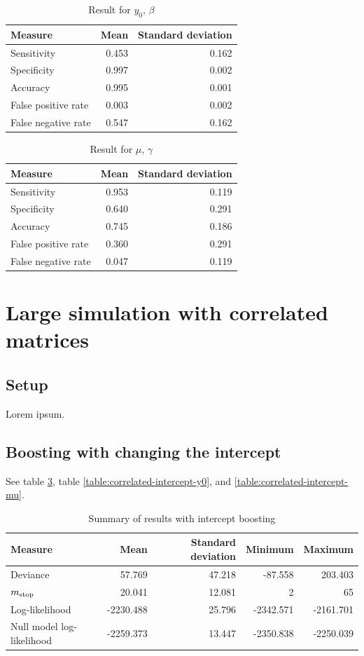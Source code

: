 \begin{table}\caption{Result for $y_0$, $\beta$}\label{table:non-correlated-no-intercept-y0}
\begin{tabular}{l|rr}
Measure &  Mean &    Standard deviation \\
\hline
Sensitivity & 0.453 & 0.162 \\
Specificity & 0.997 & 0.002 \\
Accuracy    & 0.995 & 0.001 \\
False positive rate         & 0.003 & 0.002 \\
False negative rate         & 0.547 & 0.162
\end{tabular}
\end{table}


\begin{table}\caption{Result for $\mu$, $\gamma$}\label{table:non-correlated-no-intercept-mu}
\begin{tabular}{l|rr}
Measure &  Mean & Standard deviation \\
\hline
Sensitivity & 0.953 & 0.119 \\
Specificity & 0.640 & 0.291 \\
Accuracy    & 0.745 & 0.186 \\
False positive rate         & 0.360 & 0.291 \\
False negative rate         & 0.047 & 0.119
\end{tabular}
\end{table}


\section{Large simulation with correlated matrices}
\subsection{Setup}
Lorem ipsum.

\subsection{Boosting with changing the intercept}
See table \ref{table:correlated-intercept-summary}, table \ref{table:correlated-intercept-y0}, and \ref{table:correlated-intercept-mu}.
\begin{table}\caption{Summary of results with intercept boosting}\label{table:correlated-intercept-summary}
\begin{tabular}{l|rrrr}
Measure &    Mean &     Standard deviation &  Minimum & Maximum \\
\hline
Deviance    &    57.769 & 47.218 &   -87.558 &   203.403 \\
$m_{\text{stop}}$      &    20.041 & 12.081 &     2 &    65 \\
Log-likelihood      & -2230.488 & 25.796 & -2342.571 & -2161.701 \\
Null model log-likelihood & -2259.373 & 13.447 & -2350.838 & -2250.039
\end{tabular}
\end{table}

